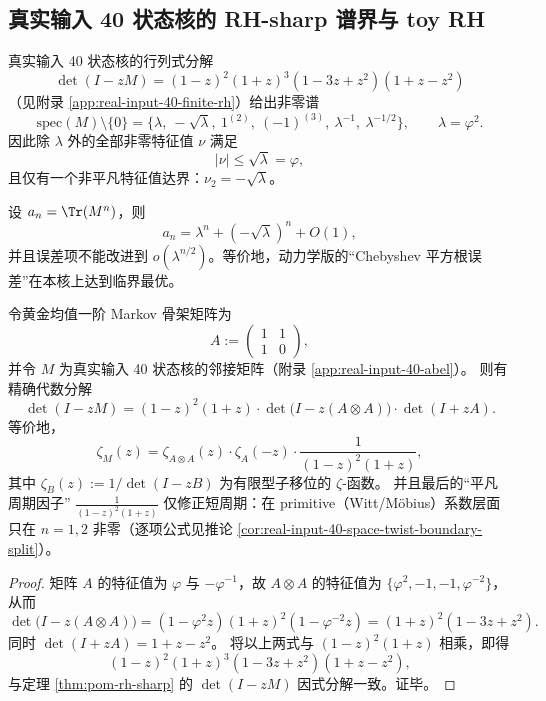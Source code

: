 \subsection{真实输入 40 状态核的 RH-sharp 谱界与 toy RH}\label{subsec:pom-rh-sharp}
\begin{theorem}\label{thm:pom-rh-sharp}
真实输入 40 状态核的行列式分解
\[
\det(I-zM)=(1-z)^2(1+z)^3(1-3z+z^2)(1+z-z^2)
\]
（见附录 \ref{app:real-input-40-finite-rh}）给出非零谱
\[
\mathrm{spec}(M)\setminus\{0\}
=\{\lambda,\ -\sqrt{\lambda},\ 1^{(2)},\ (-1)^{(3)},\ \lambda^{-1},\ \lambda^{-1/2}\},
\qquad \lambda=\varphi^2.
\]
因此除 $\lambda$ 外的全部非零特征值 $\nu$ 满足
\[
|\nu|\le \sqrt{\lambda}=\varphi,
\]
且仅有一个非平凡特征值达界：$\nu_2=-\sqrt{\lambda}$。
\end{theorem}

\begin{corollary}[平方根振荡的最优性]\label{cor:pom-rh-sharp-an}
设 $a_n=\Tr(M^n)$，则
\[
a_n=\lambda^n+(-\sqrt{\lambda})^n+O(1),
\]
并且误差项不能改进到 $o(\lambda^{n/2})$。等价地，动力学版的“Chebyshev 平方根误差”在本核上达到临界最优。
\end{corollary}

\begin{proposition}\label{prop:pom-zeta-factorization-40}
令黄金均值一阶 Markov 骨架矩阵为
$$
A:=
\begin{pmatrix}
1&1\\
1&0
\end{pmatrix},
$$
并令 \(M\) 为真实输入 40 状态核的邻接矩阵（附录 \ref{app:real-input-40-abel}）。
则有精确代数分解
$$
\det(I-zM)
=(1-z)^2(1+z)\cdot \det\!\bigl(I-z(A\otimes A)\bigr)\cdot \det(I+zA).
$$
等价地，
$$
\zeta_M(z)
=\zeta_{A\otimes A}(z)\cdot \zeta_A(-z)\cdot \frac{1}{(1-z)^2(1+z)},
$$
其中 \(\zeta_B(z):=1/\det(I-zB)\) 为有限型子移位的 \(\zeta\)-函数。
并且最后的“平凡周期因子” \(\frac{1}{(1-z)^2(1+z)}\) 仅修正短周期：在 primitive（Witt/Möbius）系数层面只在 \(n=1,2\) 非零（逐项公式见推论 \ref{cor:real-input-40-space-twist-boundary-split}）。
\end{proposition}
\begin{proof}
矩阵 \(A\) 的特征值为 \(\varphi\) 与 \(-\varphi^{-1}\)，故 \(A\otimes A\) 的特征值为
\(\{\varphi^2,-1,-1,\varphi^{-2}\}\)，从而
$$
\det\!\bigl(I-z(A\otimes A)\bigr)=(1-\varphi^2 z)(1+z)^2(1-\varphi^{-2}z)=(1+z)^2(1-3z+z^2).
$$
同时
\(
\det(I+zA)=1+z-z^2
\)。
将以上两式与 \((1-z)^2(1+z)\) 相乘，即得
$$
(1-z)^2(1+z)^3(1-3z+z^2)(1+z-z^2),
$$
与定理 \ref{thm:pom-rh-sharp} 的 \(\det(I-zM)\) 因式分解一致。证毕。
\end{proof}

